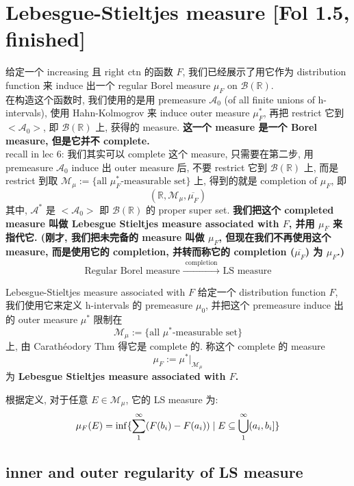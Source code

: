 \documentclass[lang=cn,11pt]{elegantbook}
\begin{document}
\chapter{Lebesgue-Stieltjes measure [Fol 1.5, finished]}
给定一个 increasing 且 right ctn 的函数 $F$, 我们已经展示了用它作为 distribution function 来 induce 出一个 regular Borel measure $\mu_F$ on $\mathcal{B}(\mathbb{R})$. \\
在构造这个函数时, 我们使用的是用 premeasure $\mathcal{A}_0$ (of all finite unions of h-intervals), 使用 Hahn-Kolmogrov 来 induce outer measure $\mu_F^*$, 再把 restrict 它到 $<\mathcal{A}_0>$, 即 $\mathcal{B}(\mathbb{R})$ 上, 获得的 measure. \textbf{这一个 measure 是一个 Borel measure, 但是它并不 complete. }\\
recall in lec 6: 我们其实可以 complete 这个 measure, 只需要在第二步, 用 premeasure $\mathcal{A}_0$ induce 出 outer measure 后, 不要 restrict 它到 $\mathcal{B}(\mathbb{R})$ 上, 而是 restrict 到取 $\mathcal{M}_\mu := \{ \text{all } \mu_F^* \text{-measurable set\}}$ 上, 得到的就是 completion of $\mu_F$, 即 $$(\mathbb{R}, \mathcal{M}_\mu, \overline{\mu_F})$$
其中, $\mathcal{A}^*$ 是 $<\mathcal{A}_0>$ 即 $\mathcal{B}(\mathbb{R})$ 的 proper super set. \textbf{我们把这个 completed measure 叫做 Lebesgue Stieltjes measure associated with $F$, 并用 $\mu_F$ 来指代它. (刚才, 我们把未完备的 measure 叫做 $\mu_F$, 但现在我们不再使用这个 measure, 而是使用它的 completion, 并转而称它的 completion ($\overline{\mu_F}$) 为 $\mu_F$.)}
$$
\text { Regular Borel measure } \xrightarrow{\text { completion }} \text { LS measure }
$$

\begin{definition}{Lebesgue-Stieltjes measure associated with $F$}
给定一个 distribution function $F$, 我们使用它来定义 h-intervals 的 premeasure $\mu_0$, 并把这个 premeasure induce 出的 outer measure $\mu^*$ 限制在 $$\mathcal{M}_\mu := \{ \text{all } \mu^* \text{-measurable set\}}$$ 上, 由 Carathéodory Thm 得它是 complete 的. 称这个 complete 的 measure $$\mu_F := \mu^* |_{\mathcal{M}_\mu}$$ 为 \textbf{Lebesgue Stieltjes measure associated with $F$. }
\end{definition}
\begin{remark}
根据定义, 对于任意 $E \in \mathcal{M}_\mu$, 它的 LS measure 为:$$
\mu_F(E) = \inf \{ \sum_1^\infty (F(b_i) - F(a_i))   \mid E \subseteq \bigcup_1^\infty (a_i, b_i]      \}
$$
\end{remark}

\section{inner and outer regularity of LS measure}
\end{document}
